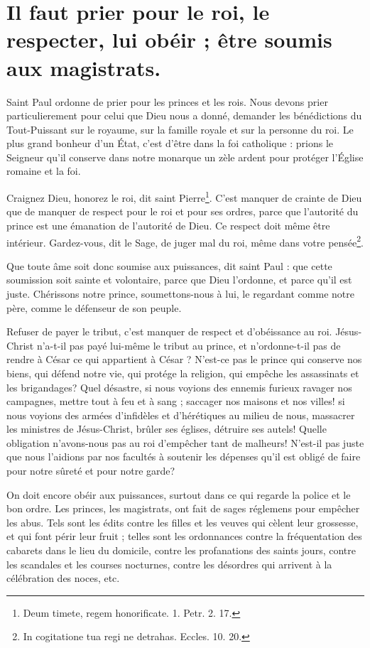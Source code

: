 \documentclass[instructions.tex]{subfiles}
\begin{document}
 
\chapter{Il faut prier pour le roi, le respecter, lui obéir ; être soumis aux magistrats.}
 
\primo Saint Paul ordonne de prier pour les princes et les rois. Nous devons prier particulierement pour celui que Dieu nous a donné, demander les bénédictions du Tout-Puissant sur le royaume, sur la famille royale et sur la personne du roi. Le plus grand bonheur d'un État, c'est d'être dans la foi catholique : prions le Seigneur qu'il conserve dans notre monarque un zèle ardent pour protéger l'Église romaine et la foi.
 
Craignez Dieu, honorez le roi, dit saint Pierre\footnote{Deum timete, regem honorificate. 1. Petr. 2. 17.}. C'est manquer de crainte de Dieu que de manquer de respect pour le roi et pour ses ordres, parce que l'autorité du prince est une émanation de l'autorité de Dieu. Ce respect doit même être intérieur. Gardez-vous, dit le Sage, de juger mal du roi, même dans votre pensée\footnote{In cogitatione tua regi ne detrahas. Eccles. 10. 20.}.
 
Que toute âme soit donc soumise aux puissances, dit saint Paul : que cette soumission soit sainte et volontaire, parce que Dieu l'ordonne, et parce qu'il est juste. Chérissons notre prince, soumettons-nous à lui, le regardant comme notre père, comme le défenseur de son peuple.
 
Refuser de payer le tribut, c'est manquer de respect et d'obéissance au roi. Jésus-Christ n'a-t-il pas payé lui-même le tribut au prince, et n'ordonne-t-il pas de rendre à César ce qui appartient à César ? N'est-ce pas le prince qui conserve nos biens, qui défend notre vie, qui protége la religion, qui empêche les assassinats et les brigandages? Quel désastre, si nous voyions des ennemis furieux ravager nos campagnes, mettre tout à feu et à sang ; saccager nos maisons et nos villes! si nous voyions des armées d'infidèles et d'hérétiques au milieu de nous, massacrer les ministres de Jésus-Christ, brûler ses églises, détruire ses autels! Quelle obligation n'avons-nous pas au roi d'empêcher tant de malheurs! N'est-il pas juste que nous l'aidions par nos facultés à soutenir les dépenses qu'il est obligé de faire pour notre sûreté et pour notre garde?
 
\secundo On doit encore obéir aux puissances, surtout dans ce qui regarde la police et le bon ordre. Les princes, les magistrats, ont fait de sages réglemens pour empêcher les abus. Tels sont les édits contre les filles et les veuves qui cèlent leur grossesse, et qui font périr leur fruit ; telles sont les ordonnances contre la fréquentation des cabarets dans le lieu du domicile, contre les profanations des saints jours, contre les scandales et les courses nocturnes, contre les désordres qui arrivent à la célébration des noces, etc.
 
\end{document}
